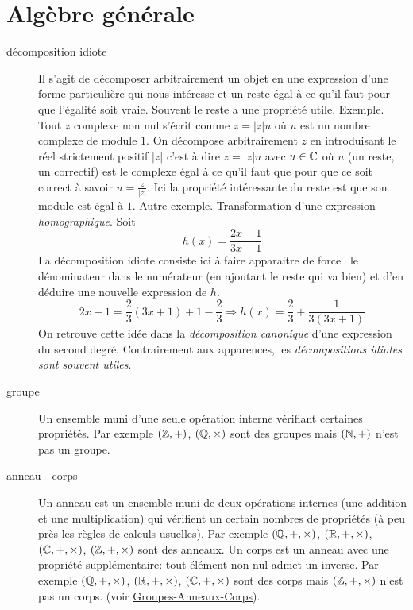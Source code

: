 \section{Algèbre générale}
\begin{description}

\item[décomposition idiote] 
Il s'agit de décomposer arbitrairement un objet en une expression d'une forme particulière qui nous intéresse et un reste égal à ce qu'il faut pour que l'égalité soit vraie. Souvent le reste a une propriété utile.\newline
Exemple. Tout $z$ complexe non nul s'écrit comme $z=|z|u$ où $u$ est un nombre complexe de module $1$. On décompose arbitrairement $z$ en introduisant le réel strictement positif $|z|$ c'est à dire $z = |z| u$ avec $u\in \mathbb{C}$ où $u$ (un reste, un correctif) est le complexe égal à ce qu'il faut que pour que ce soit correct à savoir $u = \frac{z}{|z|}$. Ici la propriété intéressante du reste est que son module est égal à $1$.\newline
Autre exemple. Transformation d'une expression \emph{homographique}. Soit
\begin{displaymath}
 h(x) = \frac{2x+1}{3x+1}
\end{displaymath}
La décomposition idiote consiste ici à faire apparaitre \og de force\fg~ le dénominateur dans le numérateur (en ajoutant le reste qui va bien) et d'en déduire une nouvelle expression de $h$.
\begin{displaymath}
 2x+1 = \frac{2}{3}(3x+1) +1-\frac{2}{3}
\Rightarrow
h(x) = \frac{2}{3}+\frac{1}{3(3x+1)}
\end{displaymath}
On retrouve cette idée dans la \emph{décomposition canonique} d'une expression du second degré. Contrairement aux apparences, les \emph{décompositions idiotes sont souvent utiles}.


 \item[groupe] Un ensemble muni d'une seule opération interne vérifiant certaines propriétés. Par exemple $(\mathbb{Z}, +)$, $(\mathbb{Q},\times)$ sont des groupes mais $(\mathbb{N},+)$ n'est pas un groupe.
 
 \item[anneau - corps]Un anneau est un ensemble muni de deux opérations internes (une addition et une multiplication) qui vérifient un certain nombres de propriétés (à peu près les règles de calculs usuelles). Par exemple $(\mathbb{Q},+,\times)$, $(\mathbb{R},+,\times)$, $(\mathbb{C},+,\times)$, $(\mathbb{Z},+,\times)$ sont des anneaux. Un corps est un anneau avec une propriété supplémentaire: tout élément non nul admet un inverse. Par exemple $(\mathbb{Q},+,\times)$, $(\mathbb{R},+,\times)$, $(\mathbb{C},+,\times)$ sont des corps mais $(\mathbb{Z},+,\times)$ n'est pas un corps. (voir \href{\baseurl C2075.pdf}{Groupes-Anneaux-Corps}).


\end{description}
